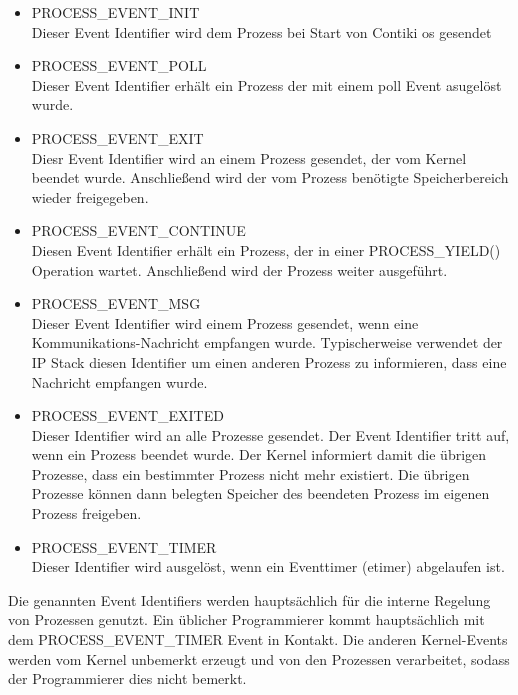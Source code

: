 	\begin{itemize}
		\item PROCESS\_EVENT\_INIT\\
		Dieser Event Identifier wird dem Prozess bei Start von Contiki \ac{os} gesendet
		\item PROCESS\_EVENT\_POLL\\
		Dieser Event Identifier erhält ein Prozess der mit einem poll Event asugelöst wurde.
		\item PROCESS\_EVENT\_EXIT\\
		Diesr Event Identifier wird an einem Prozess gesendet, der vom Kernel beendet wurde. Anschließend wird der vom Prozess benötigte Speicherbereich wieder freigegeben.
		\item PROCESS\_EVENT\_CONTINUE\\
		Diesen Event Identifier erhält ein Prozess, der in einer PROCESS\_YIELD() Operation wartet. Anschließend wird der Prozess weiter ausgeführt.
		\item PROCESS\_EVENT\_MSG\\
		Dieser Event Identifier wird einem Prozess gesendet, wenn eine Kommunikations-Nachricht empfangen wurde. Typischerweise verwendet der IP Stack diesen Identifier um einen anderen Prozess zu informieren, dass eine Nachricht empfangen wurde.
		\item PROCESS\_EVENT\_EXITED\\
		Dieser Identifier wird an alle Prozesse gesendet. Der Event Identifier tritt auf, wenn ein Prozess beendet wurde. Der Kernel informiert damit die übrigen Prozesse, dass ein bestimmter Prozess nicht mehr existiert. Die übrigen Prozesse können dann belegten Speicher des beendeten Prozess im eigenen Prozess freigeben.
		\item PROCESS\_EVENT\_TIMER\\
		Dieser Identifier wird ausgelöst, wenn ein Eventtimer (etimer) abgelaufen ist.
	\end{itemize}	
	Die genannten Event Identifiers werden hauptsächlich für die interne Regelung von Prozessen genutzt. Ein üblicher Programmierer kommt hauptsächlich mit dem PROCESS\_EVENT\_TIMER Event in Kontakt. Die anderen Kernel-Events werden vom Kernel unbemerkt erzeugt und von den Prozessen verarbeitet, sodass der Programmierer dies nicht bemerkt.
	
